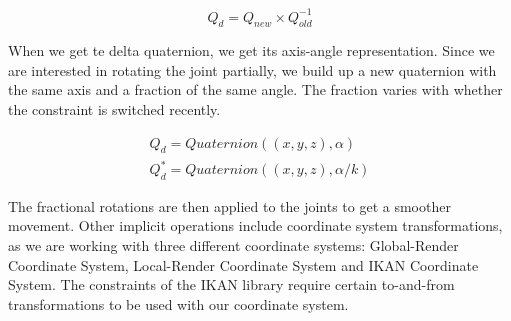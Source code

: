 \begin{equation}
Q_{d} = Q_{new} \times Q_{old}^{-1}
\label{eqn:rotator_quaternion}
\end{equation} 

When we get te delta quaternion, we get its axis-angle representation. Since we are interested in rotating the joint partially, we build up a new quaternion with the same axis and 
a fraction of the same angle. The fraction varies with whether the constraint is switched recently. 

\begin{equation} 
\begin{split}
Q_{d} = Quaternion((x,y,z),\alpha) \\  
Q_d^* = Quaternion((x,y,z), \alpha / k )
\label{eqn:partial_rotator}
\end{split}
\end{equation} 

The fractional rotations are then applied to the joints to get a smoother movement. Other implicit operations include coordinate system transformations, as we are working with three
different coordinate systems: Global-Render Coordinate System, Local-Render Coordinate System and IKAN Coordinate System. The constraints of the IKAN library require certain to-and-from  
transformations to be used with our coordinate system. 